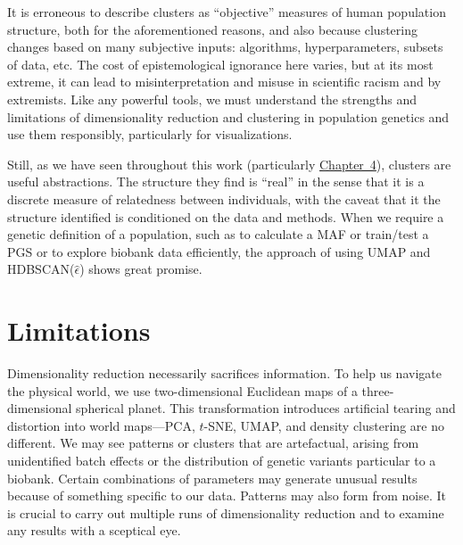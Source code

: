 It is erroneous to describe clusters as ``objective'' measures of human population structure, both for the aforementioned reasons, and also because clustering changes based on many subjective inputs: algorithms, hyperparameters, subsets of data, etc\citep{watson_philosophy_2023}. The cost of epistemological ignorance here varies, but at its most extreme, it can lead to misinterpretation and misuse in scientific racism and by extremists\citep{panofsky_genetic_2019,panofsky_how_2021}. Like any powerful tools, we must understand the strengths and limitations of dimensionality reduction and clustering in population genetics and use them responsibly, particularly for visualizations\citep{carlson_counter_2022}.

Still, as we have seen throughout this work (particularly \hyperref[chap:chapter4]{Chapter~4}), clusters are useful abstractions. The structure they find is ``real'' in the sense that it is a discrete measure of relatedness between individuals, with the caveat that it the structure identified is conditioned on the data and methods. When we require a genetic definition of a population, such as to calculate a MAF or train/test a PGS or to explore biobank data efficiently, the approach of using UMAP and HDBSCAN($\hat{\epsilon}$) shows great promise.

\section{Limitations}

Dimensionality reduction necessarily sacrifices information. To help us navigate the physical world, we use two-dimensional Euclidean maps of a three-dimensional spherical planet. This transformation introduces artificial tearing and distortion into world maps---PCA, $t$-SNE, UMAP, and density clustering are no different. We may see patterns or clusters that are artefactual, arising from unidentified batch effects or the distribution of genetic variants particular to a biobank. Certain combinations of parameters may generate unusual results because of something specific to our data. Patterns may also form from noise. It is crucial to carry out multiple runs of dimensionality reduction and to examine any results with a sceptical eye.

